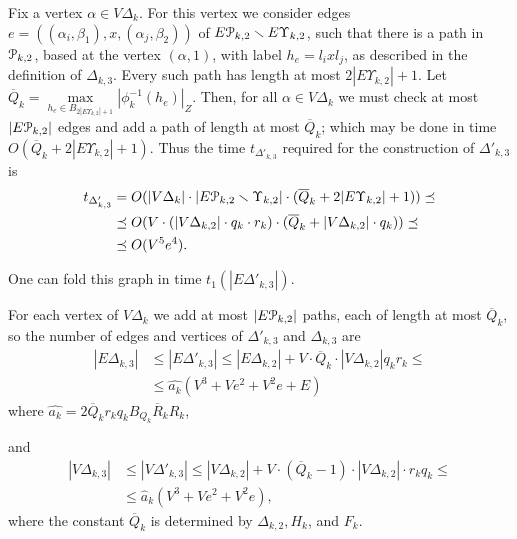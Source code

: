 \documentclass[a4paper,12pt]{article}
\renewcommand{\a}{\alpha }
\renewcommand{\b}{\beta }
\newcommand{\D}{\Delta }
\newcommand{\U}{\Upsilon }
\newcommand{\cP}{{\cal{P}}}
\numberwithin{equation}{section}
\numberwithin{figure}{section}
\begin{document}
Fix a vertex $\a \in V\D_k$. For this vertex we consider edges
$e=((\a_i,\b_1), x,(\a_j,\b_2) )$ of $E\cP_{k,2}\smallsetminus E\U_{k,2}$,
such that there
is a path in $\cP_{k,2}$, based at the  vertex $(\a,1)$, with label
$h_e=l_i x l_j$, as described in the definition of $\D_{k,3}$. Every
such path has  length at most  $2 |E \U_{k,2}| +1$. Let
$\overline{Q}_k=\max\limits_{h_e \in B_{2|E \U_{k,2}|
+1}}|\phi^{-1}_k(h_e)|_Z$.
Then, for all $\a \in V\D_k$ we must check at most
$|E\cP_{k,2}|$ edges and add a path of length at most $\overline{Q}_k$;
 which may be done  in time $O(\overline{Q}_k+2 |E\U_{k,2}| +1)$.
Thus the time $t_{\D'_{k,3}}$ required for the construction of $\D'_{k,3}$
is
\begin{equation}\label{theta'3}
\begin{split}
t_{\D'_{k,3}} &= O(|V\D_k|\cdot |E\cP_{k,2}\smallsetminus \U_{k,2}|\cdot (\overline{Q}_k+2 |E \U_{k,2}| +1))\preceq\\
&\preceq     O(V \cdot (|V\D_{k,2}|\cdot q_k \cdot r_k) \cdot
(\overline{Q}_k+|V\D_{k,2}|\cdot q_k))\preceq\\
&\preceq O(V^5e^4). 
\end{split}
\end{equation}

One can fold this graph in
time $t_1(|E\D'_{k,3}|)$.

For each vertex of $V\D_k$ we add at most $|E\cP_{k,2}|$ paths, each of
length at most $\overline Q_k$, so the number of edges and
vertices of $\D'_{k,3}$ and $\D_{k,3}$ are
\begin{equation}\label{etheta3}
\begin{split}
|E\D_{k,3}| &\le |E\D'_{k,3}|\le |E\D_{k,2}|+ V \cdot
\overline{Q}_k\cdot |V\D_{k,2}| q_k r_k \le \\
& \le \hat{a_k}(V^3+Ve^2+V^2 e+E)
\end{split}
\end{equation}
where $\hat{a_k}= 2\overline{Q}_k r_k q_k  B_{Q_k}\overline{R}_k R_k$, 

and
\begin{equation}\label{vtheta3}
\begin{split}
|V\D_{k,3}| &\le |V \D'_{k,3}|\le |V\D_{k,2}|+ V \cdot(\overline{Q}_k-1)\cdot |V\D_{k,2}|\cdot r_kq_k \le\\
 &\le \hat a_k(V^3+Ve^2+V^2 e),
\end{split}
\end{equation}
where the constant $\overline{Q}_k$ is determined  by $\D_{k,2}, H_k$, and
$F_k$.
\end{document}
